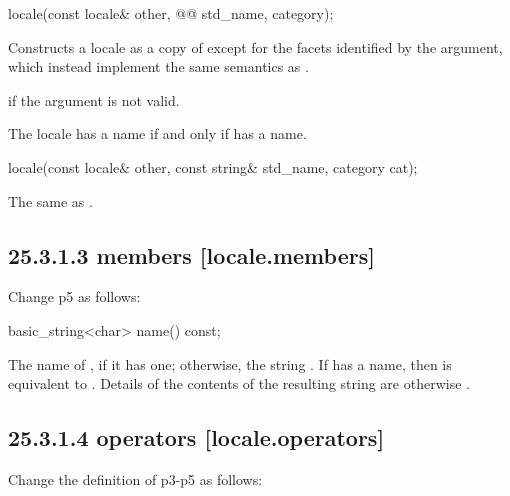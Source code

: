 \documentclass[ebook,11pt,article]{memoir}
\begin{document}
\begin{itemdecl}
locale(const locale& other, @@ std_name, category);
\end{itemdecl}

\begin{itemdescr}
\pnum
\effects
Constructs a locale as a copy of
except for the facets identified by the
argument, which instead implement the same semantics as
.

\pnum
\throws
{}
if the argument is not valid.

\pnum
\remarks
The locale has a name if and only if
has a name.
\end{itemdescr}
\begin{removedblock}
\begin{itemdecl}
locale(const locale& other, const string& std_name, category cat);
\end{itemdecl}

\begin{itemdescr}
\pnum
\effects The same as .
\end{itemdescr}
\end{removedblock}

\subsection{25.3.1.3  members [locale.members]}
Change p5 as follows:

\begin{itemdecl}
basic_string<char> name() const;
\end{itemdecl}

\begin{itemdescr}
\pnum
\returns
The name of
,
if it has one; otherwise, the string .
If
has a name, then
is equivalent to
.
Details of the contents of the resulting string are otherwise .
\end{itemdescr}

\subsection{25.3.1.4  operators [locale.operators]}
Change the definition of  p3-p5 as follows:
\end{document}
